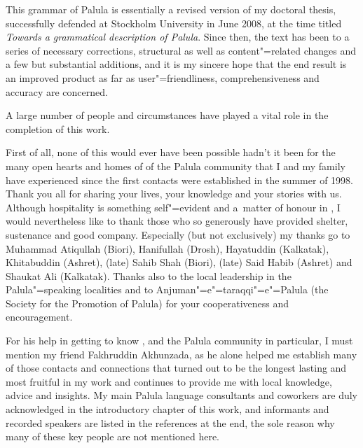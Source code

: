 \begin{refsection}

This grammar of Palula is essentially a revised version of my doctoral thesis, successfully defended at Stockholm University in June 2008, at the time titled \textit{Towards a grammatical description of Palula}. Since then, the text has been  to a series of necessary corrections, structural as well as content"=related changes and a few but substantial additions, and it is my sincere hope that the end result is an improved product as far as user"=friendliness, comprehensiveness and accuracy are concerned.


A large number of people and circumstances have played a vital role in the completion of this work.


First of all, none of this would ever have been possible hadn’t it been for the many open hearts and homes of of the Palula community that I and my family have experienced since the first contacts were established in the summer of 1998. Thank you all for sharing your lives, your knowledge and your stories with us. Although hospitality is something self"=evident and a~matter of honour in , I would nevertheless like to thank those who so generously have provided shelter, sustenance and good company. Especially (but not exclusively) my thanks go to Muhammad Atiqullah (Biori), Hanifullah (Drosh), Hayatuddin (Kalkatak), Khitabuddin (Ashret), (late) Sahib Shah (Biori), (late) Said Habib (Ashret) and Shaukat Ali (Kalkatak). Thanks also to the local leadership in the Palula"=speaking localities and to Anjuman"=e"=taraqqi"=e"=Palula (the Society for the Promotion of Palula) for your cooperativeness and encouragement. 


For his help in getting to know , and the Palula community in particular, I must mention my friend Fakhruddin Akhunzada, as he alone helped me establish many of those contacts and connections that turned out to be the longest lasting and most fruitful in my work and continues to provide me with local knowledge, advice and insights. My main Palula language consultants and coworkers are duly acknowledged in the introductory chapter of this work, and informants and recorded speakers are listed in the references at the end, the sole reason why many of these key people are not mentioned here.



\end{refsection}
